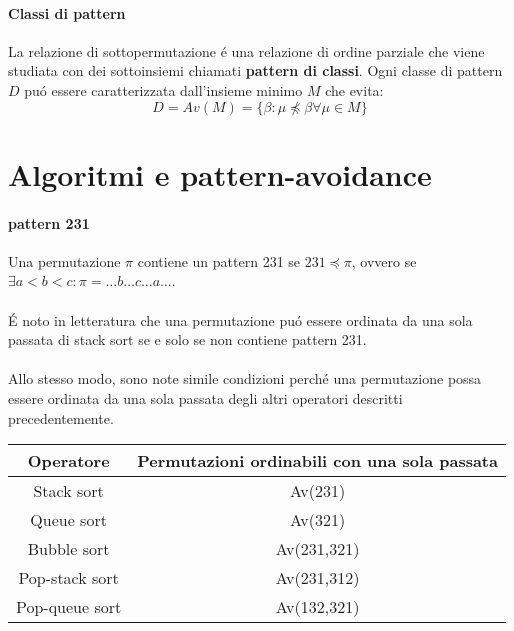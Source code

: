 \paragraph*{Classi di pattern} La relazione di sottopermutazione \'e una relazione di ordine parziale che viene studiata con dei sottoinsiemi chiamati \textbf{pattern di classi}. Ogni classe di pattern $D$ pu\'o essere caratterizzata dall'insieme minimo $M$ che evita:$$ D = Av(M) = \{\beta:\mu\not\preceq\beta\forall\mu\in M\}$$
\section*{Algoritmi e pattern-avoidance}
\paragraph*{pattern 231}Una permutazione $\pi$ contiene un pattern 231 se $231\preceq\pi$, ovvero se $\exists a<b<c: \pi =\dots{b}\dots{c}\dots{a}\dots$.\\\\
\'E noto in letteratura \cite{limbrief} che una permutazione pu\'o essere ordinata da una sola passata di stack sort se e solo se non contiene pattern 231.\\\\
Allo stesso modo, sono note simile condizioni perch\'e una permutazione possa essere ordinata da una sola passata degli altri operatori descritti precedentemente.
\begin{center}
\begin{tabular}{ |c|c| } 
\hline
\textbf{Operatore} & \textbf{Permutazioni ordinabili con una sola passata} \\ 
\hline
Stack sort & Av(231)\\ 
Queue sort & Av(321)\\ 
Bubble sort & Av(231,321)\\ 
Pop-stack sort & Av(231,312)\\ 
Pop-queue sort& Av(132,321)\\ 
\hline
\end{tabular}
\end{center}
